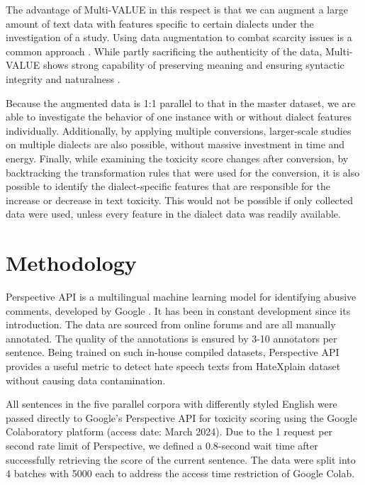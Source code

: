 \documentclass[11pt]{article}
\begin{document}
The advantage of Multi-VALUE in this respect is that we can augment a large amount of text data with features specific to certain dialects under the investigation of a study. Using data augmentation to combat scarcity issues is a common approach \citep{bird-2020-augmentation}. While partly sacrificing the authenticity of the data, Multi-VALUE shows strong capability of preserving meaning and ensuring syntactic integrity and naturalness \citep{ziems-2022-value, ziems-2023-multi}.

Because the augmented data is 1:1 parallel to that in the master dataset, we are able to investigate the behavior of one instance with or without dialect features individually. Additionally, by applying multiple conversions, larger-scale studies on multiple dialects are also possible, without massive investment in time and energy. Finally, while examining the toxicity score changes after conversion, by backtracking the transformation rules that were used for the conversion, it is also possible to identify the dialect-specific features that are responsible for the increase or decrease in text toxicity. This would not be possible if only collected data were used, unless every feature in the dialect data was readily available.

\section{Methodology}

Perspective API is a multilingual machine learning model for identifying abusive comments, developed by Google \citep{jigsaw-2017-perspective}. It has been in constant development since its introduction. The data are sourced from online forums and are all manually annotated. The quality of the annotations is ensured by 3-10 annotators per sentence. Being trained on such in-house compiled datasets, Perspective API provides a useful metric to detect hate speech texts from HateXplain dataset without causing data contamination.

All sentences in the five parallel corpora with differently styled English were passed directly to Google’s Perspective API for toxicity scoring using the Google Colaboratory platform (access date: March 2024). Due to the 1 request per second rate limit of Perspective, we defined a 0.8-second wait time after successfully retrieving the score of the current sentence. The data were split into 4 batches with 5000 each to address the access time restriction of Google Colab.
\end{document}
